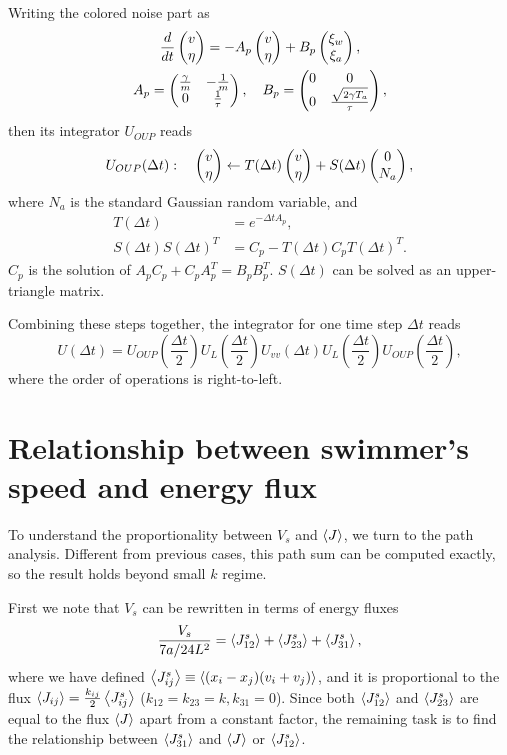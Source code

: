 \documentclass[
 amsmath,amssymb,
 aps,
 pre,
 longbibliography,
 10pt, onecolumn,
 notitlepage
]{revtex4-1}
\begin{document}
Writing the colored noise part as
\begin{gather}
    \frac{d}{dt} \pmqty{ v \\ \eta }
    = -A_p \pmqty{ v \\ \eta } + B_p \pmqty{ \xi_w \\ \xi_a }, \\
    A_p = \pmqty{ \frac{\gamma}{m} & -\frac{1}{m} \\ 0 & \frac{1}{\tau} },\quad
    B_p = \pmqty{ 0 & 0 \\ 0 & \frac{\sqrt{2\gamma T_a}}{\tau} },
\end{gather}
then its integrator $U_{OUP}$ reads
\begin{equation}
    U_{OUP}(\Delta t):\quad
    \pmqty{ v \\ \eta } \leftarrow T(\Delta t) \pmqty{ v \\ \eta } + S(\Delta t) \pmqty{ 0 \\ N_a },
\end{equation}
where $N_a$ is the standard Gaussian random variable, and
\begin{align}
T(\Delta t) &= e^{-\Delta t A_p} ,\\
S(\Delta t)S(\Delta t)^T &= C_p - T(\Delta t) C_p T(\Delta t) ^T .
\end{align}
$C_p$ is the solution of $A_p C_p + C_p A_p^T = B_pB_p^T$.
$S(\Delta t)$ can be solved as an upper-triangle matrix.

Combining these steps together, the integrator for one time step $\Delta t$ reads
\begin{equation}
    U(\Delta t) = U_{OUP}(\frac{\Delta t}{2})U_{L}(\frac{\Delta t}{2})U_{vv}(\Delta t)U_{L}(\frac{\Delta t}{2})U_{OUP}(\frac{\Delta t}{2}),
\end{equation}
where the order of operations is right-to-left.


\section{Relationship between swimmer's speed and energy flux}
To understand the proportionality between $V_s$ and $\expval{J}$, we turn to the path analysis. Different from previous cases, this path sum can be computed exactly, so the result holds beyond small $k$ regime.

First we note that $V_s$ can be rewritten in terms of energy fluxes
\begin{equation}
    \frac{V_s}{7a/24L^2} = \expval{J_{12}^s} + \expval{J_{23}^s} + \expval{J_{31}^s},
\end{equation}
where we have defined $\expval{J_{ij}^s} \equiv \expval{(x_i-x_j)(v_i+v_j)}$, and it is proportional to the flux $\expval{J_{ij}} = \frac{k_{ij}}{2}\expval{J_{ij}^s}$ ($k_{12}=k_{23}=k, k_{31}=0$).
Since both $\expval{J_{12}^s}$ and $\expval{J_{23}^s}$ are equal to the flux $\expval{J}$ apart from a constant factor, the remaining task is to find the relationship between $\expval{J_{31}^s}$ and $\expval{J}$ or $\expval{J_{12}^s}$.
\end{document}
